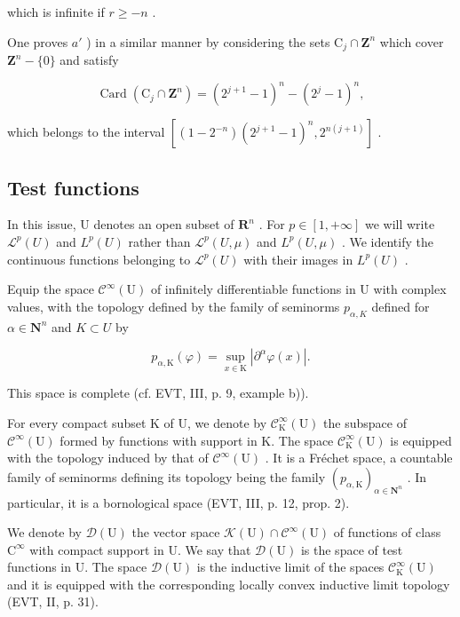 which is infinite if \(r \geqslant -n\) .

One proves \(a'\) ) in a similar manner by considering the sets \(\mathrm{C}_{j} \cap \mathbf{Z}^{n}\) which cover \(\mathbf{Z}^{n} - \{0\}\) and satisfy

\[
\operatorname{Card} \left(\mathrm{C} _ {j} \cap \mathbf {Z} ^ {n}\right) = (2 ^ {j + 1} - 1) ^ {n} - (2 ^ {j} - 1) ^ {n},
\]

which belongs to the interval \([(1-2^{-n})(2^{j+1}-1)^{n},2^{n(j+1)}]\) .

\subsection{Test functions}

In this issue, U denotes an open subset of \(\mathbf{R}^{n}\) . For \(p \in [1, +\infty]\) we will write \(\mathcal{L}^{p}(U)\) and \(L^{p}(U)\) rather than \(\mathcal{L}^{p}(U, \mu)\) and \(L^{p}(U, \mu)\) . We identify the continuous functions belonging to \(\mathcal{L}^{p}(U)\) with their images in \(L^{p}(U)\) .

Equip the space \(\mathcal{C}^{\infty}(\mathrm{U})\) of infinitely differentiable functions in U with complex values, with the topology defined by the family of seminorms \(p_{\alpha,K}\) defined for \(\alpha \in \mathbf{N}^{n}\) and \(K \subset U\) by

\[
p _ {\alpha , \mathrm{K}} (\varphi) = \sup _ {x \in \mathrm{K}} | \partial^ {\alpha} \varphi (x) |.
\]

This space is complete (cf. EVT, III, p. 9, example b)).

For every compact subset K of U, we denote by \(\mathcal{C}_{\mathrm{K}}^{\infty}(\mathrm{U})\) the subspace of \(\mathcal{C}^{\infty}(\mathrm{U})\) formed by functions with support in K. The space \(\mathcal{C}_{\mathrm{K}}^{\infty}(\mathrm{U})\) is equipped with the topology induced by that of \(\mathcal{C}^{\infty}(\mathrm{U})\) . It is a Fréchet space, a countable family of seminorms defining its topology being the family \((p_{\alpha,\mathrm{K}})_{\alpha\in\mathbf{N}^{n}}\) . In particular, it is a bornological space (EVT, III, p. 12, prop. 2).

We denote by \(\mathcal{D}(\mathrm{U})\) the vector space \(\mathcal{K}(\mathrm{U})\cap \mathcal{C}^{\infty}(\mathrm{U})\) of functions of class \(\mathrm{C}^{\infty}\) with compact support in U. We say that \(\mathcal{D}(\mathrm{U})\) is the space of test functions in U. The space \(\mathcal{D}(\mathrm{U})\) is the inductive limit of the spaces \(\mathcal{C}_{\mathrm{K}}^{\infty}(\mathrm{U})\) and it is equipped with the corresponding locally convex inductive limit topology (EVT, II, p. 31).

